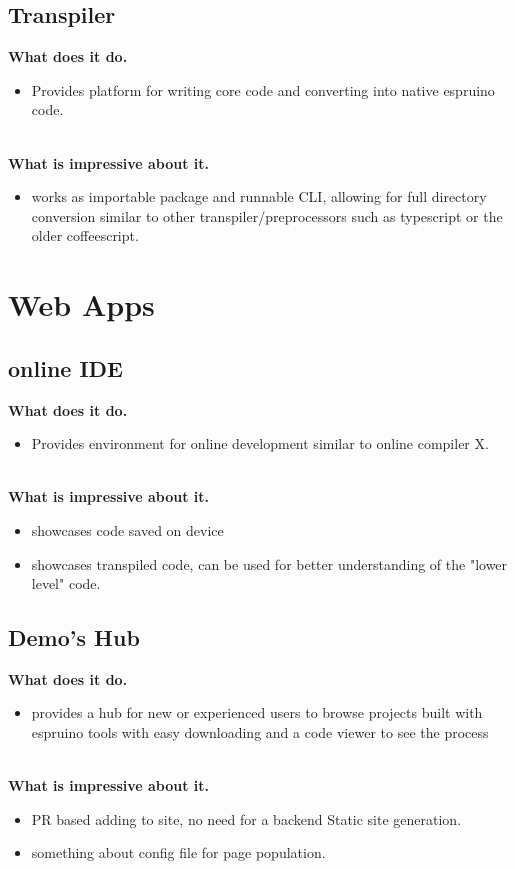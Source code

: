 \documentclass{l4proj}
\begin{document}
\subsection{Transpiler}

\textbf{What does it do.}
\begin{itemize}
    \item Provides platform for writing core code and converting into native espruino code.
\end{itemize}
\\
\textbf{What is impressive about it.}
\begin{itemize}
    \item works as importable package and runnable CLI, allowing for full directory conversion similar to other transpiler/preprocessors such as typescript or the older coffeescript.
\end{itemize}

\section{Web Apps}
\subsection{online IDE}

\textbf{What does it do.}
\begin{itemize}
    \item Provides environment for online development similar to online compiler X.
\end{itemize}
\\
\textbf{What is impressive about it.}
\begin{itemize}
    \item showcases code saved on device
    \item showcases transpiled code, can be used for better understanding of the "lower level" code.
\end{itemize}

\subsection{Demo's Hub}
\textbf{What does it do.}
\begin{itemize}
    \item provides a hub for new or experienced users to browse projects built with espruino tools with easy downloading and a code viewer to see the process
\end{itemize}
\\
\textbf{What is impressive about it.}
\begin{itemize}
    \item PR based adding to site, no need for a backend Static site generation.
    \item something about config file for page population.
\end{itemize}
\end{document}
